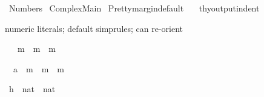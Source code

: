 %
\begin{isabellebody}%
\def\isabellecontext{Numbers}%
%
\isadelimtheory
%
\endisadelimtheory
%
\isatagtheory
{}\isamarkupfalse%
\ Numbers\isanewline
{}\ Complex{}Main\isanewline
{}%
\endisatagtheory
{\isafoldtheory}%
%
\isadelimtheory
\isanewline
%
\endisadelimtheory
%
\isadelimML
\isanewline
%
\endisadelimML
%
\isatagML
{}\isamarkupfalse%
\ {}Pretty{}margin{}default\ {}{}\ {}{}{}%
\endisatagML
{\isafoldML}%
%
\isadelimML
\isanewline
%
\endisadelimML
{}\isamarkupfalse%
\ {}{}thy{}output{}indent\ {}\ {}{}{}%
\begin{isamarkuptext}%
numeric literals; default simprules; can re-orient%
\end{isamarkuptext}%
\isamarkuptrue%
\isamarkupfalse%
\ {}{}\ {}\ m\ {}\ m\ {}\ m{}%
\isadelimproof
%
\endisadelimproof
%
\isatagproof
%
\begin{isamarkuptxt}%
\begin{isabelle}%
\ {}{}\ {}{}{}{}a{}\ {}\ m\ {}\ m\ {}\ m%
\end{isabelle}%
\end{isamarkuptxt}%
\isamarkuptrue%
\isamarkupfalse%
%
\endisatagproof
{\isafoldproof}%
%
\isadelimproof
%
\endisadelimproof
\isanewline
\isanewline
{}\isamarkupfalse%
\ h\ {}{}\ {}nat\ {}\ nat{}\isanewline

\end{isabellebody}
